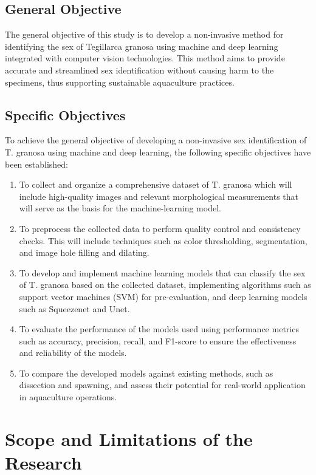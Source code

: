 \subsection{General Objective}
\label{sec:generalobjective}

The general objective of this study is to develop a non-invasive method for identifying the sex of Tegillarca granosa using machine and deep learning integrated with computer vision technologies. This method aims to provide accurate and streamlined sex identification without causing harm to the specimens, thus supporting sustainable aquaculture practices.

\subsection{Specific Objectives}
\label{sec:specificobjectives}

To achieve the general objective of developing a non-invasive sex identification of T. granosa using machine and deep learning, the following specific objectives have been established:

\begin{enumerate}
   \item To collect and organize a comprehensive dataset of T. granosa which will include high-quality images and relevant morphological measurements that will serve as the basis for the machine-learning model.
   \item To preprocess the collected data to perform quality control and consistency checks. This will include techniques such as color thresholding, segmentation, and image hole filling and dilating.
   \item To develop and implement machine learning models that can classify the sex of T. granosa based on the collected dataset, implementing algorithms such as support vector machines (SVM) for pre-evaluation, and deep learning models such as Squeezenet and Unet. 
   \item To evaluate the performance of the models used using performance metrics such as accuracy, precision, recall, and F1-score to ensure the effectiveness and reliability of the models.
   \item To compare the developed models against existing methods, such as dissection and spawning, and assess their potential for real-world application in aquaculture operations.
\end{enumerate}


\section{Scope and Limitations of the Research}
\label{sec:scopelimitations}

